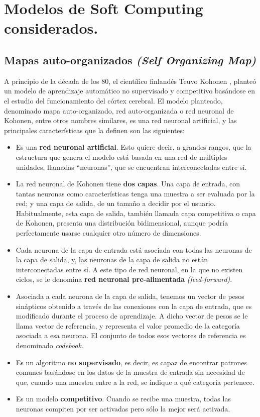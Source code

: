 ﻿%
\chapter{Modelos de Soft Computing considerados.}
\section{Mapas auto-organizados \textit{(Self Organizing Map)}}
A principio de la década de los 80, el científico finlandés Teuvo Kohonen \cite{kohonensom}, planteó un modelo de aprendizaje automático no supervisado y competitivo basándose en el estudio del funcionamiento del córtex cerebral. El modelo planteado, denominado mapa auto-organizado, red auto-organizada o red neuronal de Kohonen, entre otros nombres similares, es una red neuronal artificial, y las principales características que la definen son las siguientes:\\

\begin{itemize}
	\item Es una \textbf{red neuronal artificial}. Esto quiere decir, a grandes rangos, que la estructura que genera el modelo está basada en una red de múltiples unidades, llamadas ``neuronas'', que se encuentran interconectadas entre sí.
	
	\item La red neuronal de Kohonen tiene \textbf{dos capas}. Una capa de entrada, con tantas neuronas como características tenga una muestra a ser evaluada por la red; y una capa de salida, de un tamaño a decidir por el usuario. Habitualmente, esta capa de salida, también llamada capa competitiva o capa de Kohonen, presenta una distribución bidimensional, aunque podría perfectamente usarse cualquier otro número de dimensiones.

	\item Cada neurona de la capa de entrada está asociada con todas las neuronas de la capa de salida, y, las neuronas de la capa de salida no están interconectadas entre sí. A este tipo de red neuronal, en la que no existen ciclos, se le denomina \textbf{red neuronal pre-alimentada} \textit{(feed-forward)}.

	\item Asociada a cada neurona de la capa de salida, tenemos un vector de pesos sinápticos obtenido a través de las conexiones con la capa de entrada, que es modificado durante el proceso de aprendizaje. A dicho vector de pesos se le llama vector de referencia, y representa el valor promedio de la categoría asociada a esa neurona. El conjunto de todos esos vectores de referencia es denominado \textit{codebook}.

	\item Es un algoritmo \textbf{no supervisado}, es decir, es capaz de encontrar patrones comunes basándose en los datos de la muestra de entrada sin necesidad de que, cuando una muestra entre a la red, se indique a qué categoría pertenece.

	\item Es un modelo \textbf{competitivo}. Cuando se recibe una muestra, todas las neuronas compiten por ser activadas pero sólo la mejor será activada.
\end{itemize}

